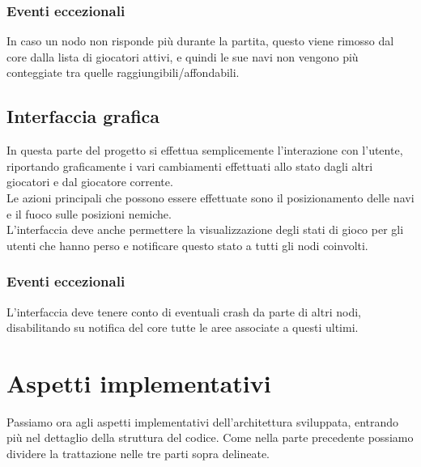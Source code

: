 \documentclass{llncs}
\begin{document}
\subsubsection{Eventi eccezionali}
In caso un nodo non risponde più durante la partita, questo viene rimosso dal core dalla lista di giocatori attivi, e quindi le sue navi non vengono più conteggiate tra quelle raggiungibili/affondabili.
\subsection{Interfaccia grafica}
In questa parte del progetto si effettua semplicemente l'interazione con l'utente, riportando graficamente i vari cambiamenti effettuati allo stato dagli altri giocatori e dal giocatore corrente.\\
Le azioni principali che possono essere effettuate sono il posizionamento delle navi e il fuoco sulle posizioni nemiche.\\
L'interfaccia deve anche permettere la visualizzazione degli stati di gioco per gli utenti che hanno perso e notificare questo stato a tutti gli nodi coinvolti.
\subsubsection{Eventi eccezionali}
L'interfaccia deve tenere conto di eventuali crash da parte di altri nodi, disabilitando su notifica del core tutte le aree associate a questi ultimi.	

\section{Aspetti implementativi}
Passiamo ora agli aspetti implementativi dell'architettura sviluppata, entrando più nel dettaglio della struttura del codice. Come nella parte precedente possiamo dividere la trattazione nelle tre parti sopra delineate.\\
\end{document}
